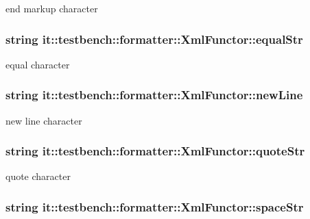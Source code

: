 end markup character \hypertarget{classit_1_1testbench_1_1formatter_1_1XmlFunctor_a576b54a739f5cf1c7c38c56bdbb73b10}{
\subsubsection[{equal\-Str}]{\setlength{\rightskip}{0pt plus 5cm}string it\-::testbench\-::formatter\-::\-Xml\-Functor\-::equal\-Str\hspace{0.3cm}{\ttfamily [private]}}}\label{d4/d4d/classit_1_1testbench_1_1formatter_1_1XmlFunctor_a576b54a739f5cf1c7c38c56bdbb73b10}
equal character \hypertarget{classit_1_1testbench_1_1formatter_1_1XmlFunctor_af4c7b4e343f365d098a8f2a66bb0da65}{
\subsubsection[{new\-Line}]{\setlength{\rightskip}{0pt plus 5cm}string it\-::testbench\-::formatter\-::\-Xml\-Functor\-::new\-Line\hspace{0.3cm}{\ttfamily [private]}}}\label{d4/d4d/classit_1_1testbench_1_1formatter_1_1XmlFunctor_af4c7b4e343f365d098a8f2a66bb0da65}
new line character \hypertarget{classit_1_1testbench_1_1formatter_1_1XmlFunctor_aad00e947b74b40678fd70216d62b7686}{
\subsubsection[{quote\-Str}]{\setlength{\rightskip}{0pt plus 5cm}string it\-::testbench\-::formatter\-::\-Xml\-Functor\-::quote\-Str\hspace{0.3cm}{\ttfamily [private]}}}\label{d4/d4d/classit_1_1testbench_1_1formatter_1_1XmlFunctor_aad00e947b74b40678fd70216d62b7686}
quote character \hypertarget{classit_1_1testbench_1_1formatter_1_1XmlFunctor_abe481c6847da4db016dbcfdd9491aca3}{
\subsubsection[{space\-Str}]{\setlength{\rightskip}{0pt plus 5cm}string it\-::testbench\-::formatter\-::\-Xml\-Functor\-::space\-Str\hspace{0.3cm}{\ttfamily [private]}}}\label{d4/d4d/classit_1_1testbench_1_1formatter_1_1XmlFunctor_abe481c6847da4db016dbcfdd9491aca3}
